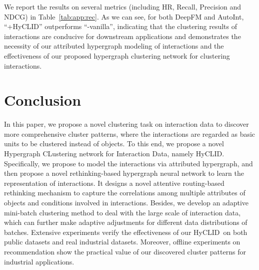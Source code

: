 \documentclass[11pt]{article}
\def\modelname{HyCLID}
\begin{document}


We report the results on several metrics (including HR, Recall, Precision and NDCG) in Table~\ref{tab:app:rec}. As we can see, for both DeepFM and AutoInt,
``+\modelname'' outperforms ``-vanilla'', indicating that the clustering results of interactions are conducive for downstream applications and demonstrates the necessity of our attributed hypergraph modeling of interactions and the effectiveness of our proposed hypergraph clustering network for clustering interactions.


\section{Conclusion}
In this paper, we propose a novel clustering task on interaction data to discover more comprehensive cluster patterns, where the interactions are regarded as basic units to be clustered instead of objects.
To this end, we propose a novel Hypergraph CLustering network for Interaction Data, namely \modelname. Specifically, we propose to model the interactions via attributed hypergraph, and then propose a novel rethinking-based hypergraph neural network to learn the representation of interactions. It designs a novel attentive routing-based rethinking mechanism to capture the correlations among multiple attributes of objects and conditions involved in interactions. Besides, we develop an adaptive mini-batch clustering method to deal with the large scale of interaction data, which can further make adaptive adjustments for different data distributions of batches. Extensive experiments verify the effectiveness of our \modelname~on both public datasets and real industrial datasets. Moreover, offline experiments on recommendation show the practical value of our discovered cluster patterns for industrial applications.
\end{document}
